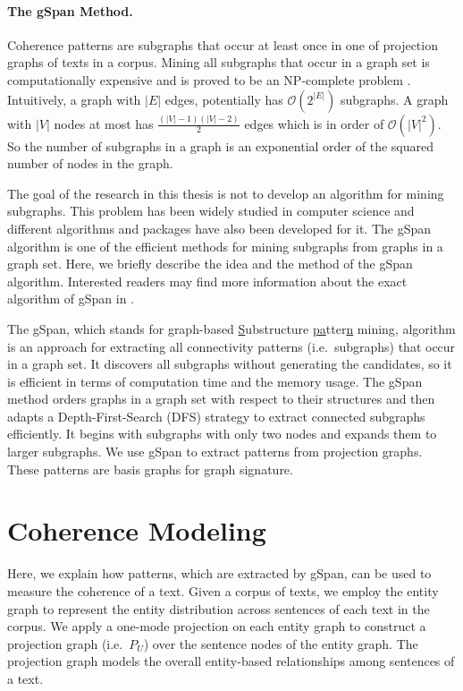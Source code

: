 \paragraph{The gSpan Method.}
%
Coherence patterns are subgraphs that occur at least once in one of projection graphs of texts in a corpus. 
Mining all subgraphs that occur in a graph set is computationally expensive and is proved to be an NP-complete problem \cite{althaus04}. 
Intuitively, a graph with $|E|$ edges, potentially has $\mathcal{O} \left( 2^{| E |} \right)$ subgraphs.  
A graph with $| V |$ nodes at most has  $\frac{(| V |-1)(| V |-2)}{2}$ edges which is in order of $\mathcal{O} \left( | V | ^2 \right)$. 
So the number of subgraphs in a graph is an exponential order of the squared number of nodes in the graph. 

The goal of the research in this thesis is not to develop an algorithm for mining subgraphs.  
This problem has been widely studied in computer science and different algorithms and packages have also been developed for it. 
The gSpan algorithm \cite{yanxifeng02} is one of the efficient methods for mining subgraphs from graphs in a graph set. 
Here, we briefly describe the idea and the method of the gSpan algorithm.  
Interested readers may find more information about the exact algorithm of gSpan in . 

The gSpan, which stands for \underline{g}raph-based \underline{S}ubstructure \underline{pa}tter\underline{n} mining, algorithm is an approach for extracting all connectivity patterns (i.e.\ subgraphs) that occur in a graph set. 
It discovers all subgraphs without generating the candidates, so
it is efficient in terms of computation time and the memory usage. 
The gSpan method orders graphs in a graph set with respect to their structures and then adapts a Depth-First-Search (DFS)  strategy to extract connected subgraphs efficiently. 
It begins with subgraphs with only two nodes and expands them to larger subgraphs. 
We use gSpan to extract patterns from projection graphs. 
These patterns are basis graphs for graph signature. 

\section{Coherence Modeling}
\label{sec:coh-modeling}

Here, we explain how patterns, which are extracted by gSpan, can be used to measure the coherence of a text. 
Given a corpus of texts, we employ the entity graph to represent the entity distribution across sentences of each text in the corpus. 
We apply a one-mode projection on each entity graph to construct a projection graph (i.e.\ $P_U$) over the sentence nodes of the entity graph. 
The projection graph models the overall entity-based relationships among sentences of a text.  

